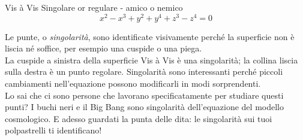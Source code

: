 \begin{surferPage}{Vis à Vis}
Singolare or regulare - amico o nemico\\
\smallskip
\[x^2	- x^3+ y^2+ y^4+ z^3- z^4	=  0\]

\vspace{0.3cm}
Le punte, o {\it singolarit\`a}, sono identificate visivamente perch\'e la superficie non \`e liscia n\'e soffice, per esempio una cuspide o una piega.\\
\vspace{0.3cm}
La cuspide a sinistra della superficie Vis \`a Vis \`e una singolarit\`a; la collina liscia sulla destra \`e un punto regolare. Singolarit\`a sono interessanti perch\'e piccoli cambiamenti nell'equazione possono modificarli in modi sorprendenti. \\

\vspace{0.3cm}
Lo sai che ci sono persone che lavorano specificatamente per studiare questi punti? I buchi neri e il Big Bang sono singolarit\`a dell'equazione del modello cosmologico. E adesso guardati la punta delle dita: le singolarit\`a sui tuoi polpastrelli ti identificano!
\end{surferPage}
